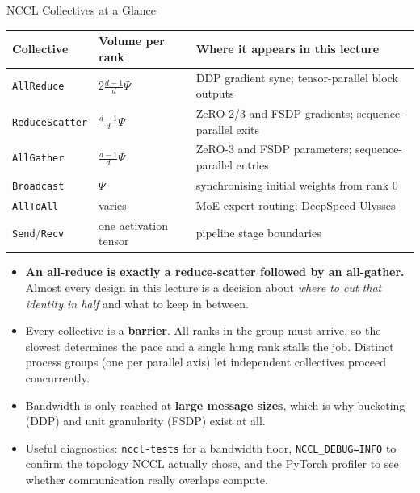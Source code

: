 \begin{frame}{NCCL Collectives at a Glance}
  \centering
  \scriptsize
  \begin{tabular}{@{}llp{6.1cm}@{}}
    \toprule
    \textbf{Collective} & \textbf{Volume per rank} & \textbf{Where it appears in this lecture} \\
    \midrule
    \texttt{AllReduce}      & $2\frac{d-1}{d}\Psi$ & DDP gradient sync; tensor-parallel block outputs \\
    \texttt{ReduceScatter}  & $\frac{d-1}{d}\Psi$  & ZeRO-2/3 and FSDP gradients; sequence-parallel exits \\
    \texttt{AllGather}      & $\frac{d-1}{d}\Psi$  & ZeRO-3 and FSDP parameters; sequence-parallel entries \\
    \texttt{Broadcast}      & $\Psi$               & synchronising initial weights from rank 0 \\
    \texttt{AllToAll}       & varies               & MoE expert routing; DeepSpeed-Ulysses \\
    \texttt{Send}/\texttt{Recv} & one activation tensor & pipeline stage boundaries \\
    \bottomrule
  \end{tabular}
  \vspace{0.21em}
  \begin{itemize}\scriptsize\itemsep0.05em
    \item[\textcolor{red}{$\blacktriangleright$}] \textbf{An all-reduce is exactly a reduce-scatter followed by an all-gather.} Almost every design in this lecture is a decision about \emph{where to cut that identity in half} and what to keep in between.
    \item[\textcolor{red}{$\blacktriangleright$}] Every collective is a \textbf{barrier}. All ranks in the group must arrive, so the slowest determines the pace and a single hung rank stalls the job. Distinct process groups (one per parallel axis) let independent collectives proceed concurrently.
    \item[\textcolor{red}{$\blacktriangleright$}] Bandwidth is only reached at \textbf{large message sizes}, which is why bucketing (DDP) and unit granularity (FSDP) exist at all.
    \item[\textcolor{red}{$\blacktriangleright$}] Useful diagnostics: \texttt{nccl-tests} for a bandwidth floor, \texttt{NCCL\_DEBUG=INFO} to confirm the topology NCCL actually chose, and the PyTorch profiler to see whether communication really overlaps compute.
  \end{itemize}
\end{frame}

